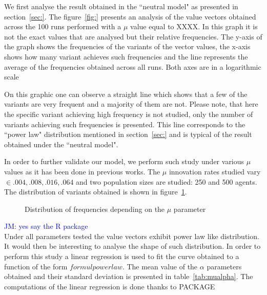 \documentclass{wscpaperproc}
\newcommand{\memo}[2]{\textcolor{#1}{#2}}
\newcommand{\jm}[1]{\memo{blue}{JM: #1\\}}
\begin{document}
We first analyse the result obtained in the ``neutral model" as presented in section~\ref{sec:}. The figure~\ref{fig:} presents an analysis of the value vectors obtained across the 100 runs performed with a $\mu$ value equal to XXXX. In this graph it is not the exact values that are analysed but their relative frequencies. The y-axis of the graph shows the frequencies of the variants of the vector values, the x-axis shows how many variant achieves such frequencies and the line represents the average of the frequencies obtained across all runs. Both axes are in a logarithmic scale

On this graphic one can observe a straight line which shows that a few of the variants are very frequent and a majority of them are not. Please note, that here the specific variant achieving high frequency is not studied, only the number of variants achieving such frequencies is presented. This line corresponds to the ``power law" distribution mentioned in section~\ref{sec:} and is typical of the result obtained under the ``neutral model". 

In order to further validate our model, we perform such study under various $\mu$ values as it has been done in previous works. The $\mu$ innovation rates studied vary $\in {.004,.008,.016,.064}$ and two population sizes are studied: 250 and 500 agents. The distribution of variants obtained is shown in figure~\ref{fig:allMutation}.

\begin{figure}[hbp]
	\begin{center}
	\end{center}
	\caption{Distribution of frequencies depending on the $\mu$ parameter}
	\label{fig:allMutation}
\end{figure}

\jm{yes say the R package}
Under all parameters tested the value vectors exhibit power law like distribution. It would then be interesting to analyse the shape of such distribution. In order to perform this study a linear regression is used to fit the curve obtained to a function of the form $formul powerlaw$. The mean value of the $\alpha$ parameters obtained and their standard deviation is presented in table~\ref{tab:mualpha}. The computations of the linear regression is done thanks to PACKAGE
\end{document}
